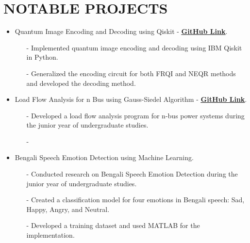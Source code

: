 \documentclass[letterpaper,11pt]{article}
\begin{document}
\section*{\textbf{NOTABLE PROJECTS}}
\begin{itemize}[left=0cm]
    \setlength\itemsep{-0.075em} %
    \setlength\parskip{-0.075em} %
    \item Quantum Image Encoding and Decoding using Qiskit - \href{https://github.com/syedshubha/QuantumImageProcessing/blob/main/qiskit_assignment_shubha.ipynb}{\underline{\textbf{GitHub Link}}}.
    \begin{itemize}[left=0cm]
        \item[-] \small \justifying Implemented quantum image encoding and decoding using IBM Qiskit in Python.
        \item[-] \small  \justifying Generalized the encoding circuit for both FRQI and NEQR methods and developed the decoding method.
    \end{itemize}
    
    \item Load Flow Analysis for n Bus using Gauss-Siedel Algorithm - \href{https://github.com/syedshubha/load_flow_analysis_gauss_seidel}{\underline{\textbf{GitHub Link}}}.
    \begin{itemize}[left=0cm]
        \item[-] \small  \justifying Developed a load flow analysis program for n-bus power systems  during the junior year of undergraduate studies.
        \item[-] \small {} 
    \end{itemize}

    \item Bengali Speech Emotion Detection using Machine Learning. 
    \begin{itemize}[left=0cm]
        \item[-] \small  \justifying Conducted research on Bengali Speech Emotion Detection during the junior year of undergraduate studies.
        \item[-] \small  \justifying Created a classification model for four emotions in Bengali speech: Sad, Happy, Angry, and Neutral.
        \item[-] \small  \justifying Developed a training dataset and used MATLAB for the implementation.
    \end{itemize}
\end{itemize}
\end{document}
